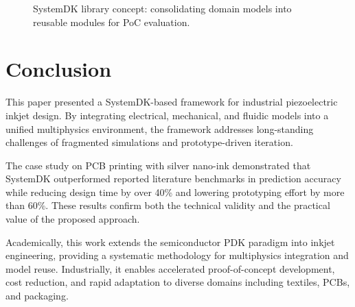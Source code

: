\documentclass[conference]{IEEEtran}
\begin{document}
\begin{figure}[t]
\centering
{}
\caption{SystemDK library concept: consolidating domain models into reusable modules for PoC evaluation.}
\label{fig:systemdk_library}
\end{figure}

\section{Conclusion}
This paper presented a SystemDK-based framework for industrial piezoelectric inkjet design.  
By integrating electrical, mechanical, and fluidic models into a unified multiphysics environment, the framework addresses long-standing challenges of fragmented simulations and prototype-driven iteration.  

The case study on PCB printing with silver nano-ink demonstrated that SystemDK outperformed reported literature benchmarks in prediction accuracy while reducing design time by over 40\% and lowering prototyping effort by more than 60\%.  
These results confirm both the technical validity and the practical value of the proposed approach.  

Academically, this work extends the semiconductor PDK paradigm into inkjet engineering, providing a systematic methodology for multiphysics integration and model reuse.  
Industrially, it enables accelerated proof-of-concept development, cost reduction, and rapid adaptation to diverse domains including textiles, PCBs, and packaging.  
\end{document}

